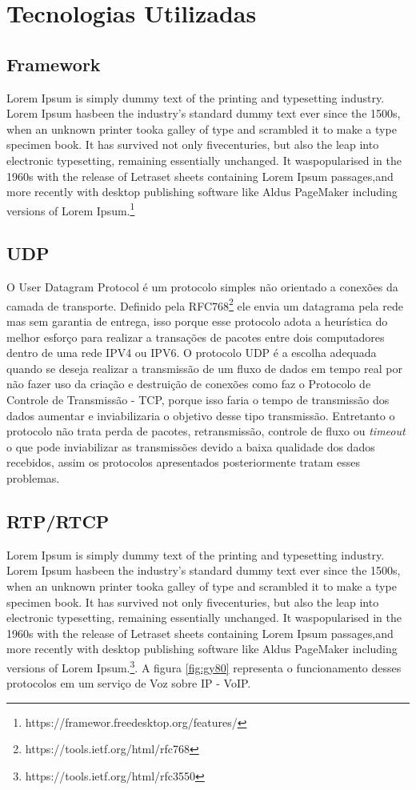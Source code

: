 \documentclass[
	12pt,				%
	openright,			%
	oneside,			%
	a4paper,			%
	chapter=TITLE,		%
	english,			%
	brazil,				%
	]{abntex2}
\begin{document}
\section{Tecnologias Utilizadas}
\subsection{Framework}
Lorem Ipsum is simply dummy text of the printing and typesetting industry. Lorem Ipsum hasbeen the industry’s standard dummy text ever since the 1500s, when an unknown printer tooka galley of type and scrambled it to make a type specimen book. It has survived not only fivecenturies, but also the leap into electronic typesetting, remaining essentially unchanged. It waspopularised in the 1960s with the release of Letraset sheets containing Lorem Ipsum passages,and more recently with desktop publishing software like Aldus PageMaker including versions of Lorem Ipsum.\footnote{https://framewor.freedesktop.org/features/}

\subsection{UDP}
O User Datagram Protocol é um protocolo simples não orientado a conexões da camada de transporte. Definido pela RFC768\footnote{https://tools.ietf.org/html/rfc768} ele envia um  datagrama pela rede mas sem garantia de entrega, isso porque esse protocolo adota a heurística do melhor esforço para realizar a transações de pacotes entre dois computadores dentro de uma rede IPV4 ou IPV6.
 O protocolo UDP é a escolha adequada quando se deseja realizar a transmissão de um fluxo de dados em tempo real por não fazer uso da criação e destruição de conexões como faz o Protocolo de Controle de Transmissão - TCP, porque isso faria o tempo de transmissão dos dados aumentar e inviabilizaria o objetivo desse tipo transmissão. Entretanto o protocolo não trata perda de pacotes, retransmissão, controle de fluxo ou \textit{timeout} o que pode inviabilizar as transmissões devido a baixa qualidade dos dados recebidos, assim os protocolos apresentados posteriormente tratam esses problemas.

\subsection{RTP/RTCP}
Lorem Ipsum is simply dummy text of the printing and typesetting industry. Lorem Ipsum hasbeen the industry’s standard dummy text ever since the 1500s, when an unknown printer tooka galley of type and scrambled it to make a type specimen book. It has survived not only fivecenturies, but also the leap into electronic typesetting, remaining essentially unchanged. It waspopularised in the 1960s with the release of Letraset sheets containing Lorem Ipsum passages,and more recently with desktop publishing software like Aldus PageMaker including versions of Lorem Ipsum.\footnote{https://tools.ietf.org/html/rfc3550}.  A figura \ref{fig:gy80}  representa o funcionamento desses protocolos em um serviço de Voz sobre IP - VoIP.
\end{document}
